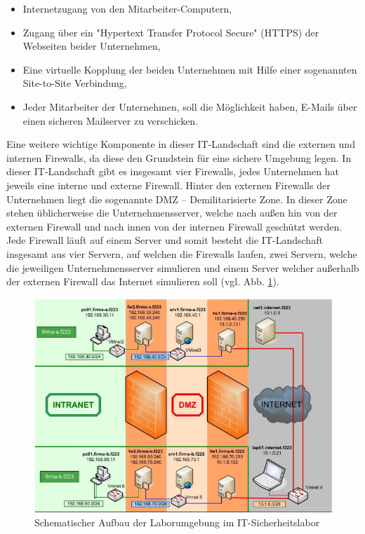 \documentclass[
a4paper,     %
 headsepline, %
footsepline, %
titlepage,   %
 halfparskip,     %
 fleqn,       %
12pt         %
]{scrartcl}  %
\begin{document}
\begin{itemize}
\item Internetzugang von den Mitarbeiter-Computern,
\item Zugang über ein "Hypertext Transfer Protocol Secure" (HTTPS) der Webseiten beider Unternehmen,
\item Eine virtuelle Kopplung der beiden Unternehmen mit Hilfe einer sogenannten Site-to-Site Verbindung,
\item Jeder Mitarbeiter der Unternehmen, soll die Möglichkeit haben, E-Mails über einen sicheren Mailserver zu verschicken.
\end{itemize}
Eine weitere wichtige Komponente in dieser IT-Landschaft sind die externen und internen Firewalls, da diese den Grundstein für eine sichere Umgebung legen. In dieser IT-Landschaft gibt es insgesamt vier Firewalls, jedes Unternehmen hat jeweils eine interne und externe Firewall. Hinter den externen Firewalls der Unternehmen liegt die sogenannte DMZ – Demilitarisierte Zone. In dieser Zone stehen üblicherweise die Unternehmensserver, welche nach außen hin von der externen Firewall und nach innen von der internen Firewall geschützt werden. Jede Firewall läuft auf einem Server und somit besteht die IT-Landschaft insgesamt aus vier Servern, auf welchen die Firewalls laufen, zwei Servern, welche die jeweiligen Unternehmensserver simulieren und einem Server welcher außerhalb der externen Firewall das Internet simulieren soll (vgl. Abb. \ref{fig:appStat}).

\begin{figure}[!h]
	\includegraphics[width=\textwidth]{pictures/laborumgebung.png}
	\caption{Schematischer Aufbau der Laborumgebung im IT-Sicherheitslabor \cite{JueNeuSaDue}}
	\label{fig:appStat}
\end{figure}
\end{document}

